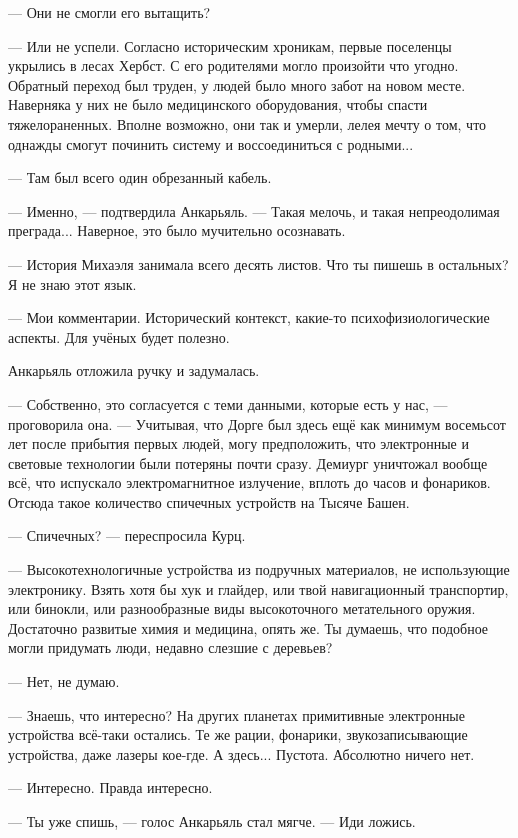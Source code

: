 \documentclass[a4paper,10pt,fleqn]{book}\usepackage{polyglossia}\setdefaultlanguage{english}\setotherlanguage{russian}\defaultfontfeatures{Ligatures=TeX,Mapping=tex-text}\usepackage{xcolor}\definecolor{lightgray}{HTML}{bbbbbb}\color{lightgray}\newcommand{\ml}[3]{\textcolor{black}{#3}}
\begin{document}
--- Они не смогли его вытащить?

--- Или не успели.
Согласно историческим хроникам, первые поселенцы укрылись в лесах Хербст.
С его родителями могло произойти что угодно.
Обратный переход был труден, у людей было много забот на новом месте.
Наверняка у них не было медицинского оборудования, чтобы спасти тяжелораненных.
Вполне возможно, они так и умерли, лелея мечту о том, что однажды смогут починить систему и воссоединиться с родными...

--- Там был всего один обрезанный кабель.

--- Именно, --- подтвердила Анкарьяль.
--- Такая мелочь, и такая непреодолимая преграда...
Наверное, это было мучительно осознавать.

--- История Михаэля занимала всего десять листов.
Что ты пишешь в остальных?
Я не знаю этот язык.

--- Мои комментарии.
Исторический контекст, какие-то психофизиологические аспекты.
Для учёных будет полезно.

Анкарьяль отложила ручку и задумалась.

--- Собственно, это согласуется с теми данными, которые есть у нас, --- проговорила она.
--- Учитывая, что Дорге был здесь ещё как минимум восемьсот лет после прибытия первых людей, могу предположить, что электронные и световые технологии были потеряны почти сразу.
Демиург уничтожал вообще всё, что испускало электромагнитное излучение, вплоть до часов и фонариков.
Отсюда такое количество спичечных устройств на Тысяче Башен.

--- Спичечных? --- переспросила Курц.

--- Высокотехнологичные устройства из подручных материалов, не использующие электронику.
Взять хотя бы хук и глайдер, или твой навигационный транспортир, или бинокли, или разнообразные виды высокоточного метательного оружия.
Достаточно развитые химия и медицина, опять же.
Ты думаешь, что подобное могли придумать люди, недавно слезшие с деревьев?

--- Нет, не думаю.

--- Знаешь, что интересно?
На других планетах примитивные электронные устройства всё-таки остались.
Те же рации, фонарики, звукозаписывающие устройства, даже лазеры кое-где.
А здесь...
Пустота.
Абсолютно ничего нет.

--- Интересно.
Правда интересно.

--- Ты уже спишь, --- голос Анкарьяль стал мягче.
--- Иди ложись.
\end{document}
